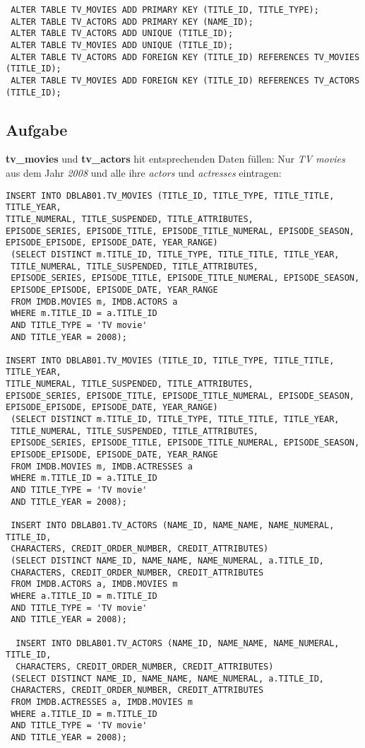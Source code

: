 \documentclass[11pt,a4paper,DIV=9]{scrartcl}
\newcounter{temp}
\newcommand{\aufgabe}[1]{
  \setcounter{temp}{\value{subsection}}
  \setcounter{subsection}{#1}
  \addtocounter{subsection}{-1}
  \subsection{Aufgabe}
  \setcounter{subsection}{\value{temp}}
}
\begin{document}
 \begin{lstlisting}
 ALTER TABLE TV_MOVIES ADD PRIMARY KEY (TITLE_ID, TITLE_TYPE);
 ALTER TABLE TV_ACTORS ADD PRIMARY KEY (NAME_ID); 
 ALTER TABLE TV_ACTORS ADD UNIQUE (TITLE_ID);
 ALTER TABLE TV_MOVIES ADD UNIQUE (TITLE_ID);
 ALTER TABLE TV_ACTORS ADD FOREIGN KEY (TITLE_ID) REFERENCES TV_MOVIES (TITLE_ID);
 ALTER TABLE TV_MOVIES ADD FOREIGN KEY (TITLE_ID) REFERENCES TV_ACTORS (TITLE_ID);
 \end{lstlisting}
 \aufgabe{6}
 \textbf{tv\_movies} und \textbf{tv\_actors} hit entsprechenden Daten f\"ullen:
 Nur \textit{TV movies} aus dem Jahr \textit{2008} und alle ihre \textit{actors} und \textit{actresses} eintragen:
 \begin{lstlisting}
INSERT INTO DBLAB01.TV_MOVIES (TITLE_ID, TITLE_TYPE, TITLE_TITLE, TITLE_YEAR, 
TITLE_NUMERAL, TITLE_SUSPENDED, TITLE_ATTRIBUTES, 
EPISODE_SERIES, EPISODE_TITLE, EPISODE_TITLE_NUMERAL, EPISODE_SEASON, 
EPISODE_EPISODE, EPISODE_DATE, YEAR_RANGE)
 (SELECT DISTINCT m.TITLE_ID, TITLE_TYPE, TITLE_TITLE, TITLE_YEAR, 
 TITLE_NUMERAL, TITLE_SUSPENDED, TITLE_ATTRIBUTES, 
 EPISODE_SERIES, EPISODE_TITLE, EPISODE_TITLE_NUMERAL, EPISODE_SEASON, 
 EPISODE_EPISODE, EPISODE_DATE, YEAR_RANGE
 FROM IMDB.MOVIES m, IMDB.ACTORS a
 WHERE m.TITLE_ID = a.TITLE_ID
 AND TITLE_TYPE = 'TV movie'
 AND TITLE_YEAR = 2008);
 
INSERT INTO DBLAB01.TV_MOVIES (TITLE_ID, TITLE_TYPE, TITLE_TITLE, TITLE_YEAR, 
TITLE_NUMERAL, TITLE_SUSPENDED, TITLE_ATTRIBUTES, 
EPISODE_SERIES, EPISODE_TITLE, EPISODE_TITLE_NUMERAL, EPISODE_SEASON, 
EPISODE_EPISODE, EPISODE_DATE, YEAR_RANGE)
 (SELECT DISTINCT m.TITLE_ID, TITLE_TYPE, TITLE_TITLE, TITLE_YEAR, 
 TITLE_NUMERAL, TITLE_SUSPENDED, TITLE_ATTRIBUTES, 
 EPISODE_SERIES, EPISODE_TITLE, EPISODE_TITLE_NUMERAL, EPISODE_SEASON, 
 EPISODE_EPISODE, EPISODE_DATE, YEAR_RANGE
 FROM IMDB.MOVIES m, IMDB.ACTRESSES a
 WHERE m.TITLE_ID = a.TITLE_ID
 AND TITLE_TYPE = 'TV movie'
 AND TITLE_YEAR = 2008);
 
 INSERT INTO DBLAB01.TV_ACTORS (NAME_ID, NAME_NAME, NAME_NUMERAL, TITLE_ID, 
 CHARACTERS, CREDIT_ORDER_NUMBER, CREDIT_ATTRIBUTES)
 (SELECT DISTINCT NAME_ID, NAME_NAME, NAME_NUMERAL, a.TITLE_ID, 
 CHARACTERS, CREDIT_ORDER_NUMBER, CREDIT_ATTRIBUTES
 FROM IMDB.ACTORS a, IMDB.MOVIES m
 WHERE a.TITLE_ID = m.TITLE_ID
 AND TITLE_TYPE = 'TV movie'
 AND TITLE_YEAR = 2008);
 
  INSERT INTO DBLAB01.TV_ACTORS (NAME_ID, NAME_NAME, NAME_NUMERAL, TITLE_ID, 
  CHARACTERS, CREDIT_ORDER_NUMBER, CREDIT_ATTRIBUTES)
 (SELECT DISTINCT NAME_ID, NAME_NAME, NAME_NUMERAL, a.TITLE_ID, 
 CHARACTERS, CREDIT_ORDER_NUMBER, CREDIT_ATTRIBUTES
 FROM IMDB.ACTRESSES a, IMDB.MOVIES m
 WHERE a.TITLE_ID = m.TITLE_ID
 AND TITLE_TYPE = 'TV movie'
 AND TITLE_YEAR = 2008);
 
 \end{lstlisting}
\end{document}
